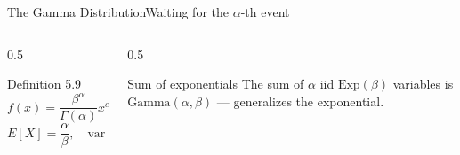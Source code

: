 \documentclass[aspectratio=169,11pt]{beamer}
\begin{document}
\begin{frame}{The Gamma Distribution}{Waiting for the $\alpha$-th event}
  \begin{columns}[T]
    \begin{column}{0.5\textwidth}
      \begin{block}{Definition 5.9}
        \[ f(x) = \frac{\beta^\alpha}{\Gamma(\alpha)}x^{\alpha-1}e^{-\beta x}, \; x>0 \]
        \[ E[X]=\frac{\alpha}{\beta}, \quad \text{var}(X)=\frac{\alpha}{\beta^2} \]
      \end{block}
    \end{column}
    \begin{column}{0.5\textwidth}
      \begin{exampleblock}{Sum of exponentials}
        \small The sum of $\alpha$ iid $\text{Exp}(\beta)$ variables is
        $\text{Gamma}(\alpha,\beta)$ — generalizes the exponential.
      \end{exampleblock}
      \centering
    \end{column}
  \end{columns}
\end{frame}
\end{document}
